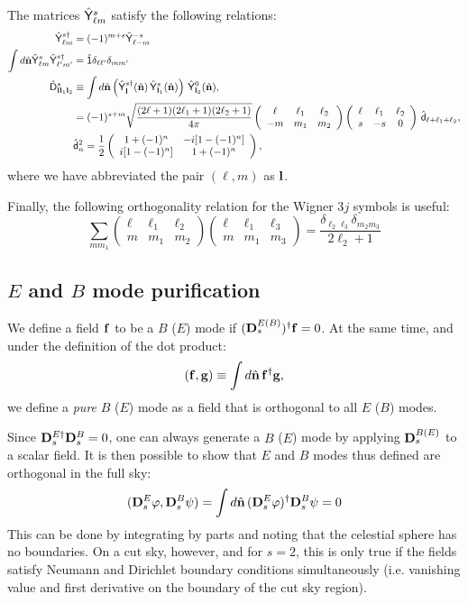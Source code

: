 \documentclass[a4paper,10pt]{article}
\newcommand{\nv}{\hat{\bf n}}
\newcommand{\wtj}[6]{\left(\begin{array}{ccc} #1 & #2 & #3\\#4 & #5 & #6\end{array} \right)}
\begin{document}
  The matrices $\hat{\sf Y}^s_{\ell m}$ satisfy the following relations:
  \begin{align}
    \hat{\sf Y}^{s\dag}_{\ell m}&=(-1)^{m+s}\hat{\sf Y}^{-s}_{\ell -m}\\
    \int d\nv \hat{\sf Y}^s_{\ell m}\hat{\sf Y}^{s\dag}_{\ell'm'}&=\hat{\sf 1}\delta_{\ell\ell'}\delta_{mm'}\\
    \hat{\sf D}^s_{{\bf l}{\bf l}_1{\bf l}_2}&\equiv\int d\nv \left(\hat{\sf Y}^{s\dag}_{\bf l}(\nv)\,\hat{\sf Y}^{s}_{{\bf l}_1}(\nv)\right)\,\hat{\sf Y}^0_{{\bf l}_2}(\nv),\\
    &=(-1)^{s+m}\sqrt{\frac{(2\ell+1)(2\ell_1+1)(2\ell_2+1)}{4\pi}}\wtj{\ell}{\ell_1}{\ell_2}{-m}{m_1}{m_2}\wtj{\ell}{\ell_1}{\ell_2}{s}{-s}{0}\,\hat{\sf d}_{\ell+\ell_1+\ell_2},\\
    \hspace{12pt}&\hat{\sf d}^2_n=\frac{1}{2}\left(\begin{array}{cc}
                                       1+(-1)^n & -i[1-(-1)^n]\\
                                       i[1-(-1)^n] & 1+(-1)^n
                                     \end{array}\right),
  \end{align}
  where we have abbreviated the pair $(\ell,m)$ as ${\bf l}$.

  Finally, the following orthogonality relation for the Wigner 3$j$ symbols is useful:
  \begin{equation}
    \sum_{mm_1}\wtj{\ell}{\ell_1}{\ell_2}{m}{m_1}{m_2}\wtj{\ell}{\ell_1}{\ell_3}{m}{m_1}{m_3}=\frac{\delta_{\ell_2\ell_3}\delta_{m_2m_3}}{2\ell_2+1}
  \end{equation}

\subsection{$E$ and $B$ mode purification}
  We define a field ${\bf f}$ to be a $B$ ($E$) mode if $({\bf D}^{E(B)}_s)^\dag{\bf f}=0$. At the same time, and under the definition of the dot product:
  \begin{equation}
    ({\bf f},{\bf g})\equiv\int d\nv\,{\bf f}^\dag{\bf g},
  \end{equation}
  we define a {\sl pure} $B$ ($E$) mode as a field that is orthogonal to all $E$ ($B$) modes.
  
  Since ${\bf D}^{E\dag}_s{\bf D}^B_s=0$, one can always generate a $B$ ($E$) mode by applying ${\bf D}^{B(E)}_s$ to a scalar field. It is then possible to show that $E$ and $B$ modes thus defined are orthogonal in the full sky:
  \begin{equation}
    ({\bf D}^E_s\varphi,{\bf D}^B_s\psi)=\int d\nv\,({\bf D}^E_s\varphi)^\dag{\bf D}^B_s\psi=0
  \end{equation}
  This can be done by integrating by parts and noting that the celestial sphere has no boundaries. On a cut sky, however, and for $s=2$, this is only true if the fields satisfy Neumann and Dirichlet boundary conditions simultaneously (i.e. vanishing value and first derivative on the boundary of the cut sky region).
  
\end{document}
